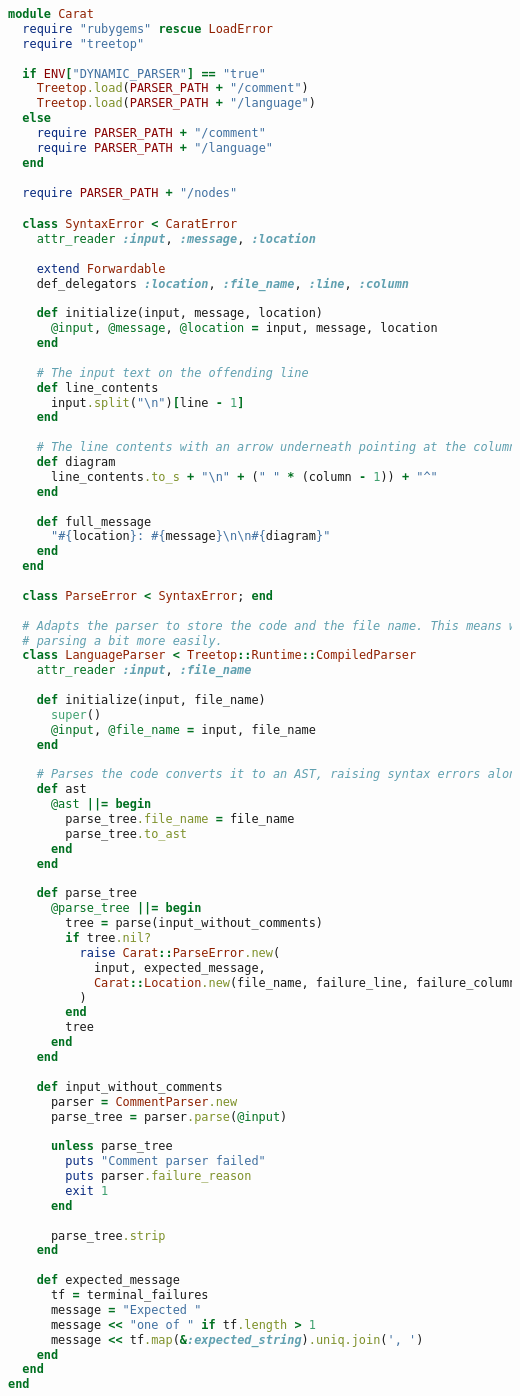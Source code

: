 \begin{lstlisting}[title={\small\Helvetica parser/parser.rb},language=Ruby]
module Carat
  require "rubygems" rescue LoadError
  require "treetop"
  
  if ENV["DYNAMIC_PARSER"] == "true"
    Treetop.load(PARSER_PATH + "/comment")
    Treetop.load(PARSER_PATH + "/language")
  else
    require PARSER_PATH + "/comment"
    require PARSER_PATH + "/language"
  end
  
  require PARSER_PATH + "/nodes"

  class SyntaxError < CaratError
    attr_reader :input, :message, :location
    
    extend Forwardable
    def_delegators :location, :file_name, :line, :column
    
    def initialize(input, message, location)
      @input, @message, @location = input, message, location
    end
    
    # The input text on the offending line
    def line_contents
      input.split("\n")[line - 1]
    end
    
    # The line contents with an arrow underneath pointing at the column
    def diagram
      line_contents.to_s + "\n" + (" " * (column - 1)) + "^"
    end
    
    def full_message
      "#{location}: #{message}\n\n#{diagram}"
    end
  end
  
  class ParseError < SyntaxError; end
  
  # Adapts the parser to store the code and the file name. This means we can break up the process of
  # parsing a bit more easily.
  class LanguageParser < Treetop::Runtime::CompiledParser
    attr_reader :input, :file_name
    
    def initialize(input, file_name)
      super()
      @input, @file_name = input, file_name
    end
    
    # Parses the code converts it to an AST, raising syntax errors along the way if necessary
    def ast
      @ast ||= begin
        parse_tree.file_name = file_name
        parse_tree.to_ast
      end
    end
    
    def parse_tree
      @parse_tree ||= begin
        tree = parse(input_without_comments)
        if tree.nil?
          raise Carat::ParseError.new(
            input, expected_message,
            Carat::Location.new(file_name, failure_line, failure_column)
          )
        end
        tree
      end
    end
    
    def input_without_comments
      parser = CommentParser.new
      parse_tree = parser.parse(@input)
      
      unless parse_tree
        puts "Comment parser failed"
        puts parser.failure_reason
        exit 1
      end
      
      parse_tree.strip
    end
    
    def expected_message
      tf = terminal_failures
      message = "Expected "
      message << "one of " if tf.length > 1
      message << tf.map(&:expected_string).uniq.join(', ')
    end
  end
end

\end{lstlisting}
